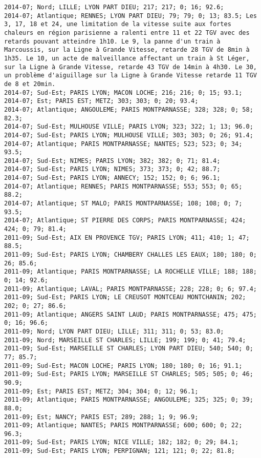 \documentclass{article}
\begin{document}
\begin{Verbatim}[commandchars=\\\{\}]
2014-07; Nord; LILLE; LYON PART DIEU; 217; 217; 0; 16; 92.6; 
2014-07; Atlantique; RENNES; LYON PART DIEU; 79; 79; 0; 13; 83.5; Les 3, 17, 18 et 24, une limitation de la vitesse suite aux fortes chaleurs en région parisienne a ralenti entre 11 et 22 TGV avec des retards pouvant atteindre 1h10. Le 9, la panne d'un train à Marcoussis, sur la Ligne à Grande Vitesse, retarde 28 TGV de 8min à 1h35. Le 10, un acte de malveillance affectant un train à St Léger, sur la Ligne à Grande Vitesse, retarde 43 TGV de 14min à 4h30. Le 30, un problème d'aiguillage sur la Ligne à Grande Vitesse retarde 11 TGV de 8 et 20min.
2014-07; Sud-Est; PARIS LYON; MACON LOCHE; 216; 216; 0; 15; 93.1; 
2014-07; Est; PARIS EST; METZ; 303; 303; 0; 20; 93.4; 
2014-07; Atlantique; ANGOULEME; PARIS MONTPARNASSE; 328; 328; 0; 58; 82.3; 
2014-07; Sud-Est; MULHOUSE VILLE; PARIS LYON; 323; 322; 1; 13; 96.0; 
2014-07; Sud-Est; PARIS LYON; MULHOUSE VILLE; 303; 303; 0; 26; 91.4; 
2014-07; Atlantique; PARIS MONTPARNASSE; NANTES; 523; 523; 0; 34; 93.5; 
2014-07; Sud-Est; NIMES; PARIS LYON; 382; 382; 0; 71; 81.4; 
2014-07; Sud-Est; PARIS LYON; NIMES; 373; 373; 0; 42; 88.7; 
2014-07; Sud-Est; PARIS LYON; ANNECY; 152; 152; 0; 6; 96.1; 
2014-07; Atlantique; RENNES; PARIS MONTPARNASSE; 553; 553; 0; 65; 88.2; 
2014-07; Atlantique; ST MALO; PARIS MONTPARNASSE; 108; 108; 0; 7; 93.5; 
2014-07; Atlantique; ST PIERRE DES CORPS; PARIS MONTPARNASSE; 424; 424; 0; 79; 81.4; 
2011-09; Sud-Est; AIX EN PROVENCE TGV; PARIS LYON; 411; 410; 1; 47; 88.5; 
2011-09; Sud-Est; PARIS LYON; CHAMBERY CHALLES LES EAUX; 180; 180; 0; 26; 85.6; 
2011-09; Atlantique; PARIS MONTPARNASSE; LA ROCHELLE VILLE; 188; 188; 0; 14; 92.6; 
2011-09; Atlantique; LAVAL; PARIS MONTPARNASSE; 228; 228; 0; 6; 97.4; 
2011-09; Sud-Est; PARIS LYON; LE CREUSOT MONTCEAU MONTCHANIN; 202; 202; 0; 27; 86.6; 
2011-09; Atlantique; ANGERS SAINT LAUD; PARIS MONTPARNASSE; 475; 475; 0; 16; 96.6; 
2011-09; Nord; LYON PART DIEU; LILLE; 311; 311; 0; 53; 83.0; 
2011-09; Nord; MARSEILLE ST CHARLES; LILLE; 199; 199; 0; 41; 79.4; 
2011-09; Sud-Est; MARSEILLE ST CHARLES; LYON PART DIEU; 540; 540; 0; 77; 85.7; 
2011-09; Sud-Est; MACON LOCHE; PARIS LYON; 180; 180; 0; 16; 91.1; 
2011-09; Sud-Est; PARIS LYON; MARSEILLE ST CHARLES; 505; 505; 0; 46; 90.9; 
2011-09; Est; PARIS EST; METZ; 304; 304; 0; 12; 96.1; 
2011-09; Atlantique; PARIS MONTPARNASSE; ANGOULEME; 325; 325; 0; 39; 88.0; 
2011-09; Est; NANCY; PARIS EST; 289; 288; 1; 9; 96.9; 
2011-09; Atlantique; NANTES; PARIS MONTPARNASSE; 600; 600; 0; 22; 96.3; 
2011-09; Sud-Est; PARIS LYON; NICE VILLE; 182; 182; 0; 29; 84.1; 
2011-09; Sud-Est; PARIS LYON; PERPIGNAN; 121; 121; 0; 22; 81.8; 

\end{Verbatim}
\end{document}
